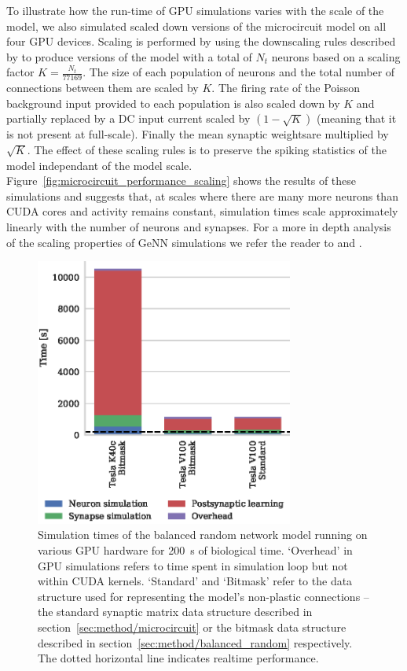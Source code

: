 \documentclass[utf8]{frontiersSCNS} %
\begin{document}
To illustrate how the run-time of GPU simulations varies with the scale of the model, we also simulated scaled down versions of the microcircuit model on all four GPU devices.
Scaling is performed by using the downscaling rules described by \citet{VanAlbada2015} to produce versions of the model with a total of $N_t$ neurons based on a scaling factor $K = \frac{N_t}{77169}$.
The size of each population of neurons and the total number of connections between them are scaled by $K$.
The firing rate of the Poisson background input provided to each population is also scaled down by $K$ and partially replaced by a DC input current scaled by $(1 - \sqrt{K})$ (meaning that it is not present at full-scale).
Finally the mean synaptic weightsare multiplied by $\sqrt{K}$.
The effect of these scaling rules is to preserve the spiking statistics of the model independant of the model scale.
Figure~\ref{fig:microcircuit_performance_scaling} shows the results of these simulations and suggests that, at scales where there are many more neurons than CUDA cores and activity remains constant, simulation times scale approximately linearly with the number of neurons and synapses.
For a more in depth analysis of the scaling properties of GeNN simulations we refer the reader to \citet{Yavuz2016} and \citet{Stimberg2018}.

\begin{figure}
    \begin{center}
        \includegraphics[width=85mm]{figures/stdp_performance}
    \end{center}
    \caption{Simulation times of the balanced random network model running on various GPU hardware for \SI{200}{\second} of biological time.
    `Overhead' in GPU simulations refers to time spent in simulation loop but not within CUDA kernels.
    `Standard' and `Bitmask' refer to the data structure used for representing the model's non-plastic connections -- the standard synaptic matrix data structure described in section~\ref{sec:method/microcircuit} or the bitmask data structure described in section~\ref{sec:method/balanced_random} respectively.
    The dotted horizontal line indicates realtime performance.}
    \label{fig:stdp_performance}
\end{figure}
\end{document}
